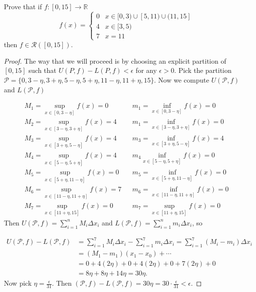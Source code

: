 \documentclass[oneside]{amsart}
\theoremstyle{definition}
\newcommand{\rr}{\mathbb R}
\begin{document}
\begin{tcolorbox}[colback=black!5!white,colframe=black!75!black,title= Exercise $6.5.$] Prove that if $f\colon [0,15] \to \rr$
\[
f(x) = \begin{cases}
	0 & x \in [0,3) \cup [5,11) \cup (11,15] \\
	4 & x \in [3,5) \\
	7 & x=11
\end{cases} \]
then $f \in \mathcal R([0,15])$.

\tcblower 
\begin{proof} The way that we will proceed is by choosing an explicit partition of $[0,15]$ such that $U (P,f) - L(P,f) < \epsilon$ for any $\epsilon > 0$. Pick the partition $\mathcal P = \{  0, 3-\eta, 3+\eta, 5-\eta,  5+\eta, 11-\eta, 11+\eta, 15\}$. Now we compute $U(\mathcal P,f)$ and $L( \mathcal P, f)$

\begin{align*}
M_1 = \sup_{x \in [0, 3-\eta]} f(x) = 0 & & m_1 = \inf_{ x\in [0, 3-\eta]} f(x) = 0\\
M_2 =  \sup_{x \in [3-\eta, 3+\eta]} f(x) = 4  & & m_1 =  \inf_{x \in [3-\eta, 3+\eta]} f(x) = 0\\
M_3 = \sup_{x \in [3+\eta, 5-\eta]} f(x) = 4 && m_3 =  \inf_{x \in [3+\eta, 5-\eta]} f(x)   =4 \\
M_4 = \sup_{x \in [5-\eta, 5+\eta] } f(x) = 4  && m_4 \inf_{x \in [5-\eta, 5+\eta] } f(x) = 0 \\
M_5 = \sup_{x \in [5+\eta, 11-\eta] } f(x) = 0 && m_5 = \inf_{x \in [5+\eta, 11-\eta] } f(x) = 0 \\
M_6 = \sup_{x \in [11-\eta, 11+\eta] } f(x) = 7 && m_6  = \inf_{x \in [11-\eta, 11 + \eta] } f(x) = 0 \\
M_7 = \sup_{x \in [11+\eta, 15] } f(x) = 0 && m_7 = \sup_{x \in [11+\eta, 15] } f(x) = 0
\end{align*}
Then $U(\mathcal P,f) = \sum_{i=1}^n M_i \Delta x_i$ and $L(\mathcal P, f) = \sum_{i=1}^n m_i \Delta x_i$, so 

\begin{align*}
	U(\mathcal P,f) - L(\mathcal P, f) &= \sum_{i=1}^7 M_i \Delta x_i - \sum_{i=1}^7 m_i \Delta x_i = \sum_{i=1}^7 (M_i-m_i) \Delta x_i \\
	&= (M_1-m_1) (x_1-x_0) + \cdots \\
	&= 0 + 4 (2\eta) + 0+4(2\eta) + 0 + 7 (2\eta) + 0 \\
	&=8\eta +8\eta +14 \eta = 30\eta.
\end{align*}
Now pick $\eta =\frac{\epsilon}{31}$. Then $(\mathcal P,f) - L(\mathcal P, f)  = 30 \eta = 30\cdot \frac{\epsilon}{31} < \epsilon$. 
\end{proof} 
\end{tcolorbox}
\end{document}
